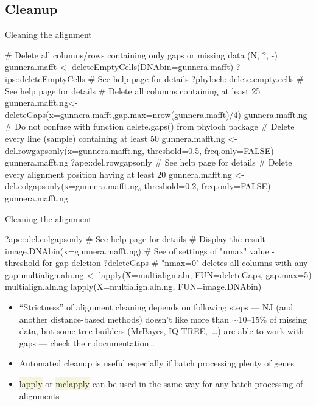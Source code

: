\documentclass[compress, xelatex, 11pt, xcolor=svgnames, aspectratio=169,
	hyperref={
		bookmarks=true,
		unicode=true,
		colorlinks=true,
		pdftitle={Molecular data in R},
		plainpages=false,
		pdfauthor={Vojtech Zeisek},
		pdfsubject={Course about phylogeny and evolution in R},
		pdfcreator={XeLaTeX},
		pdfkeywords={R, evolution, phylogeny, molecular data},
		linkcolor=Crimson, %
		anchorcolor=Magenta, %
		citecolor=Magenta, %
		filecolor=Magenta, %
		menucolor=Magenta, %
		urlcolor=DodgerBlue, %
		},
	url={hyphens, lowtilde} %
	]{beamer}
\renewcommand{\texttt}[1]{\colorbox{Beige}{{\ttfamily #1}}}
\begin{document}
\subsection{Cleanup}

\begin{frame}[fragile]{Cleaning the alignment}
	\begin{spluscode}
    # Delete all columns/rows containing only gaps or missing data (N, ?, -)
    gunnera.mafft <- deleteEmptyCells(DNAbin=gunnera.mafft)
    ?ips::deleteEmptyCells # See help page for details
    ?phyloch::delete.empty.cells # See help page for details
    # Delete all columns containing at least 25%
    gunnera.mafft.ng<-deleteGaps(x=gunnera.mafft,gap.max=nrow(gunnera.mafft)/4)
    gunnera.mafft.ng
    # Do not confuse with function delete.gaps() from phyloch package
    # Delete every line (sample) containing at least 50%
    gunnera.mafft.ng <- del.rowgapsonly(x=gunnera.mafft.ng, threshold=0.5,
      freq.only=FALSE)
    gunnera.mafft.ng
    ?ape::del.rowgapsonly # See help page for details
    # Delete every alignment position having at least 20%
    gunnera.mafft.ng <- del.colgapsonly(x=gunnera.mafft.ng, threshold=0.2,
      freq.only=FALSE)
    gunnera.mafft.ng
	\end{spluscode}
\end{frame}

\begin{frame}[fragile]{Cleaning the alignment}
	\begin{spluscode}
    ?ape::del.colgapsonly # See help page for details
    # Display the result
    image.DNAbin(x=gunnera.mafft.ng)
    # See of settings of "nmax" value - threshold for gap deletion
    ?deleteGaps # "nmax=0" deletes all columns with any gap
    multialign.aln.ng <- lapply(X=multialign.aln, FUN=deleteGaps, gap.max=5)
    multialign.aln.ng
    lapply(X=multialign.aln.ng, FUN=image.DNAbin)
	\end{spluscode}
	\vfil
	\begin{itemize}
		\item \enquote{Strictness} of alignment cleaning depends on following steps --- NJ (and another distance-based methods) doesn't like more than $\sim$10--15\% of missing data, but some tree builders (MrBayes, IQ-TREE,~\ldots) are able to work with gaps --- check their documentation\ldots
		\item Automated cleanup is useful especially if batch processing plenty of genes
		\item \texttt{lapply} or \texttt{mclapply} can be used in the same way for any batch processing of alignments
	\end{itemize}
\end{frame}
\end{document}
